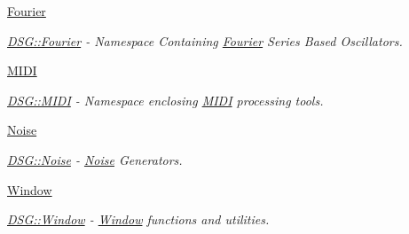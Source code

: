 \begin{DoxyCompactItemize}
 \hyperlink{namespace_d_s_g_1_1_fourier}{Fourier}
\begin{DoxyCompactList}\small\item\em \hyperlink{namespace_d_s_g_1_1_fourier}{D\+S\+G\+::\+Fourier} -\/ Namespace Containing \hyperlink{namespace_d_s_g_1_1_fourier}{Fourier} Series Based Oscillators. \end{DoxyCompactList}\item 
 \hyperlink{namespace_d_s_g_1_1_m_i_d_i}{M\+I\+D\+I}
\begin{DoxyCompactList}\small\item\em \hyperlink{namespace_d_s_g_1_1_m_i_d_i}{D\+S\+G\+::\+M\+I\+D\+I} -\/ Namespace enclosing \hyperlink{namespace_d_s_g_1_1_m_i_d_i}{M\+I\+D\+I} processing tools. \end{DoxyCompactList}\item 
 \hyperlink{namespace_d_s_g_1_1_noise}{Noise}
\begin{DoxyCompactList}\small\item\em \hyperlink{namespace_d_s_g_1_1_noise}{D\+S\+G\+::\+Noise} -\/ \hyperlink{namespace_d_s_g_1_1_noise}{Noise} Generators. \end{DoxyCompactList}\item 
 \hyperlink{namespace_d_s_g_1_1_window}{Window}
\begin{DoxyCompactList}\small\item\em \hyperlink{namespace_d_s_g_1_1_window}{D\+S\+G\+::\+Window} -\/ \hyperlink{namespace_d_s_g_1_1_window}{Window} functions and utilities. \end{DoxyCompactList}\end{DoxyCompactItemize}
